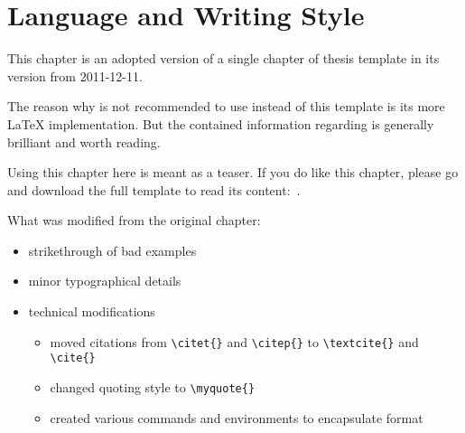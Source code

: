 %
%
% 
% 
% 

\newenvironment{mykeithtabbing}[1]{%
\begin{tabular}{lp{0.9\hsize}}
}{%
\end{tabular}
}

\newcommand{\mybadgood}[2]{%
\begin{mykeithtabbing}
{}\emph{Bad:}  & \sout{#1}  \\
\emph{Good:}   & #2  \\
\end{mykeithtabbing}

}

\chapter{Language and Writing Style}
\label{chap:Style}

\begin{framed}

  This chapter is an adopted version of a single chapter of
  \citeauthor{KeithThesis} thesis template \cite{KeithThesis} in its
  version from 2011-12-11.

  The reason why \cite{KeithThesis} is not recommended to use instead
  of this template is its more  \LaTeX{}
  implementation. But the contained information regarding  is generally brilliant and worth reading.

  Using this chapter here is meant as a teaser. If you do like this
  chapter, please go and download the full template to read its
  content:~\cite{KeithThesis}.

  What was modified from the original chapter:
    \begin{itemize}
    \item strikethrough of bad examples
    \item minor typographical details
    \item technical modifications
      \begin{itemize}
      \item moved citations from \verb+\citet{}+ and
        \verb+\citep{}+ to \verb+\textcite{}+ and \verb+\cite{}+
      \item changed quoting style to \verb+\myquote{}+
      \item created various commands and environments to encapsulate
        format
      \end{itemize}
    \end{itemize}
\end{framed}


